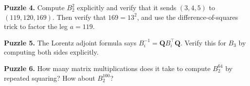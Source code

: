 \begin{displayquote}
\textbf{Puzzle 4.} Compute $B_2^2$ explicitly and verify that it sends $(3, 4, 5)$ to $(119, 120, 169)$. Then verify that $169 = 13^2$, and use the difference-of-squares trick to factor the leg $a = 119$.
\end{displayquote}



\begin{displayquote}
\textbf{Puzzle 5.} The Lorentz adjoint formula says $B_i^{-1} = \mathbf{Q} B_i^\top \mathbf{Q}$. Verify this for $B_3$ by computing both sides explicitly.
\end{displayquote}



\begin{displayquote}
\textbf{Puzzle 6.} How many matrix multiplications does it take to compute $B_2^{64}$ by repeated squaring? How about $B_2^{100}$?
\end{displayquote}

